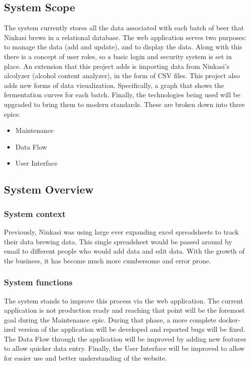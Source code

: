 \documentclass[draftclsnofoot,onecolumn,journal,letterpaper,compsoc,10pt]{IEEEtran}
\begin{document}
    \subsection{System Scope}
    
    The system currently stores all the data associated with each batch of beer that Ninkasi brews in a relational database.  The web application serves two purposes: to manage the data (add and update), and to display the data.  Along with this there is a concept of user roles, so a basic login and security system is set in place.  An extension that this project adds is importing data from Ninkasi's alcolyzer (alcohol content analyzer), in the form of CSV files.  This project also adds new forms of data visualization.  Specifically, a graph that shows the fermentation curves for each batch. Finally, the technologies being used will be upgraded to bring them to modern standards.  These are broken down into three epics:
    
    \begin{itemize}
        \item Maintenance 
        \item Data Flow
        \item User Interface
    \end{itemize}
    
    \subsection{System Overview}
    
        \subsubsection{System context}
        Previously, Ninkasi was using large ever expanding excel spreadsheets to track their data brewing data.  This single spreadsheet would be passed around by email to different people who would add data and edit data. With the growth of the business, it has become much more cumbersome and error prone.
    
        \subsubsection{System functions}
        The system stands to improve this process via the web application.  The current application is not production ready and reaching that point will be the foremost goal during the Maintenance epic. During that phase, a more complete docker-ized version of the application will be developed and reported bugs will be fixed.  The Data Flow through the application will be improved by adding new features to allow quicker data entry. Finally, the User Interface will be improved to allow for easier use and better understanding of the website.
        
\end{document}
